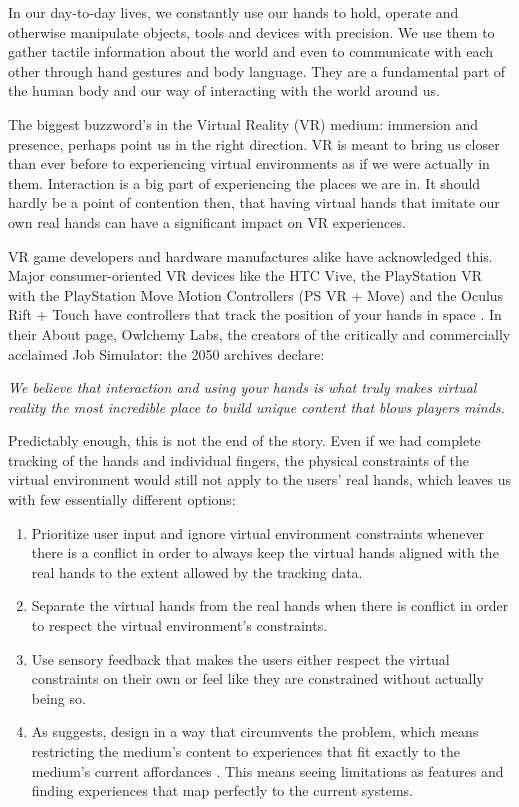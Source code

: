 In our day-to-day lives, we constantly use our hands to hold, operate and otherwise manipulate objects, tools and devices with precision. We use them to gather tactile information about the world and even to communicate with each other through hand gestures and body language. They are a fundamental part of the human body and our way of interacting with the world around us.

The biggest buzzword's in the Virtual Reality (VR) medium: immersion and presence, perhaps point us in the right direction. VR is meant to bring us closer than ever before to experiencing virtual environments as if we were actually in them. Interaction is a big part of experiencing the places we are in. It should hardly be a point of contention then, that having virtual hands that imitate our own real hands can have a significant impact on VR experiences.

VR game developers and hardware manufactures alike have acknowledged this. Major consumer-oriented VR devices like the HTC Vive, the PlayStation VR  with the PlayStation Move Motion Controllers (PS VR + Move) and the Oculus Rift + Touch have controllers that track the position of your hands in space \parencite{htcvive2016, psvr2016, psmove2010, oculus2016}. In their About page, Owlchemy Labs, the creators of the critically and commercially acclaimed \parencite{UnityAwards2016, SteamSpyJobSim} Job Simulator: the 2050 archives \parencite{OwlchemyLabs2016} declare:

\begin{displayquote}
\textit{We believe that interaction and using your hands is what truly makes virtual reality the most incredible place to build unique content that blows players minds.} \parencite{aboutOwlchemyLabs}
\end{displayquote}

Predictably enough, this is not the end of the story. Even if we had complete tracking of the hands and individual fingers, the physical constraints of the virtual environment would still not apply to the users' real hands, which leaves us with few essentially different options:

\begin{enumerate}
\item Prioritize user input and ignore virtual environment constraints whenever there is a conflict in order to always keep the virtual hands aligned with the real hands to the extent allowed by the tracking data.
\item Separate the virtual hands from the real hands when there is conflict in order to respect the virtual environment's constraints.
\item Use sensory feedback that makes the users either respect the virtual constraints on their own or feel like they are constrained without actually being so.
\item As \parencite{Schell2015} suggests, design in a way that circumvents the problem, which means restricting the medium's content to experiences that fit exactly to the medium's current affordances \parencite{Norman}. This means seeing limitations as features and finding experiences that map perfectly to the current systems.
\end{enumerate}

